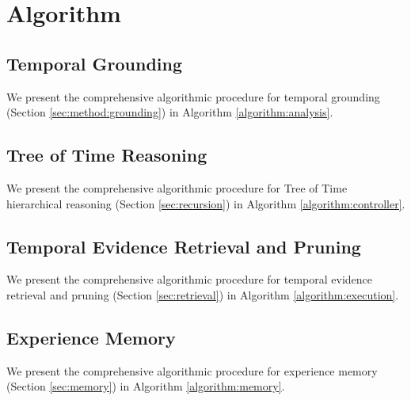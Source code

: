 
\newcommand{\Dep}{\mathrm{D}}

\newpage
\appendix

\section{Algorithm}\label{appendix:alg}


\subsection{Temporal Grounding}\label{appendix:alg:analysis}
We present the comprehensive algorithmic procedure for temporal grounding (Section \ref{sec:method:grounding}) in Algorithm \ref{algorithm:analysis}.



\subsection{Tree of Time Reasoning}\label{appendix:alg:controller}
We present the comprehensive algorithmic procedure for
Tree of Time hierarchical reasoning (Section \ref{sec:recursion}) in Algorithm \ref{algorithm:controller}.




\subsection{Temporal Evidence Retrieval and Pruning}\label{appendix:alg:execution}
We present the comprehensive algorithmic procedure for temporal evidence retrieval and pruning (Section \ref{sec:retrieval}) in Algorithm \ref{algorithm:execution}.

\subsection{Experience Memory}\label{appendix:alg:memory}
We present the comprehensive algorithmic procedure for experience memory (Section \ref{sec:memory}) in Algorithm \ref{algorithm:memory}.

